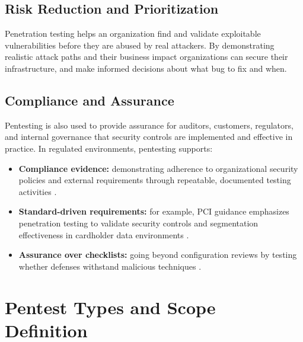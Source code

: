 \subsection{Risk Reduction and Prioritization}
\label{subsubsec:ch1-risk}
Penetration testing helps an organization find and validate exploitable vulnerabilities before they are abused by real attackers.
By demonstrating realistic attack paths and their business impact organizations can secure their infrastructure, and make informed decisions about what bug to fix and when. \cite{WhatPentestCF}

\subsection{Compliance and Assurance}
\label{subsubsec:ch1-compliance}
Pentesting is also used to provide assurance for auditors, customers, regulators, and internal governance that security controls are implemented and effective in practice.
In regulated environments, pentesting supports:
\begin{itemize}
    \item \textbf{Compliance evidence:} demonstrating adherence to organizational security policies and external requirements through repeatable, documented testing activities \cite{nistSP800115}.
    \item \textbf{Standard-driven requirements:} for example, PCI guidance emphasizes penetration testing to validate security controls and segmentation effectiveness in cardholder data environments \cite{pciPenTestGuida}.
    \item \textbf{Assurance over checklists:} going beyond configuration reviews by testing whether defenses withstand malicious techniques \cite{cisaPenTest}.
\end{itemize}



\section{Pentest Types and Scope Definition}
\label{subsec:ch1-types-scope}

